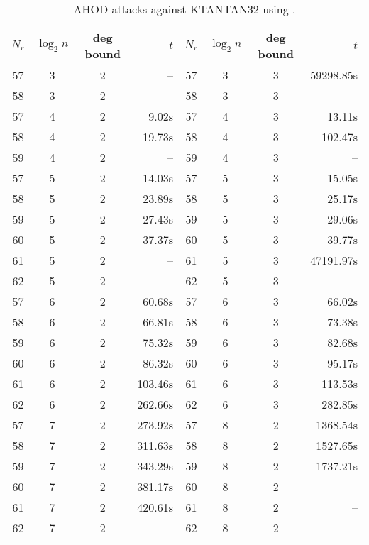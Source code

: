 \begin{table}[htbp]
\begin{center}
\begin{tabular}{|c|c|c|r||c|c|c|r|}
\hline
$N_r$ & $\log_2 n$ & deg bound & $t$ & $N_r$ & $\log_2 n$ & deg bound & $t$\\
\hline
57 & 3 & 2 &    -- & 57 & 3 & 3 & 59298.85s \\
58 & 3 & 2 &    -- & 58 & 3 & 3 &      --\\
\hline
57 & 4 & 2 &  9.02s  & 57 & 4 & 3 &  13.11s \\
58 & 4 & 2 & 19.73s  & 58 & 4 & 3 & 102.47s \\
59 & 4 & 2 &    --   & 59 & 4 & 3 &     --\\
\hline
57 & 5 & 2 &  14.03s & 57 & 5 & 3 &     15.05s \\
58 & 5 & 2 &  23.89s & 58 & 5 & 3 &     25.17s \\
59 & 5 & 2 &  27.43s & 59 & 5 & 3 &     29.06s \\
60 & 5 & 2 &  37.37s & 60 & 5 & 3 &     39.77s \\
61 & 5 & 2 &     --  & 61 & 5 & 3 &  47191.97s \\
62 & 5 & 2 &     --  & 62 & 5 & 3 &        --  \\
\hline
57 & 6 & 2 &   60.68s & 57 & 6 & 3 &  66.02s \\
58 & 6 & 2 &   66.81s & 58 & 6 & 3 &  73.38s \\
59 & 6 & 2 &   75.32s & 59 & 6 & 3 &  82.68s \\
60 & 6 & 2 &   86.32s & 60 & 6 & 3 &  95.17s \\
61 & 6 & 2 &  103.46s & 61 & 6 & 3 & 113.53s \\
62 & 6 & 2 &  262.66s & 62 & 6 & 3 & 282.85s \\
\hline
57 & 7 & 2 & 273.92s & 57 & 8 & 2 & 1368.54s\\
58 & 7 & 2 & 311.63s & 58 & 8 & 2 & 1527.65s\\
59 & 7 & 2 & 343.29s & 59 & 8 & 2 & 1737.21s\\
60 & 7 & 2 & 381.17s & 60 & 8 & 2 & --      \\
61 & 7 & 2 & 420.61s & 61 & 8 & 2 & --      \\
62 & 7 & 2 & --      & 62 & 8 & 2 & --      \\
\hline
\end{tabular}
\end{center}
\caption{AHOD attacks against KTANTAN32 using \PolyBoRi.}
\label{tab:ahod-ktantan32-polybori}
\end{table}

